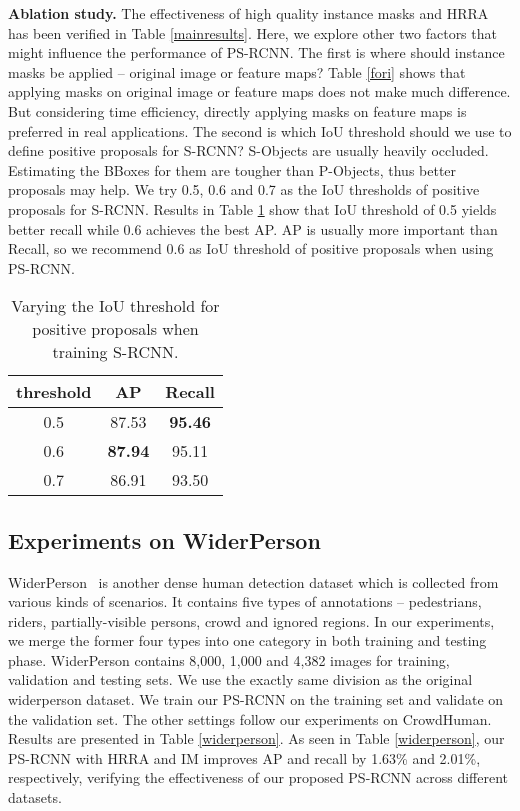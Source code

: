 \documentclass{article}
\begin{document}
\noindent \textbf{Ablation study.} The effectiveness of high quality instance masks and HRRA has been verified in Table \ref{mainresults}. Here, we explore other two factors that might influence the performance of PS-RCNN. The first is where should instance masks be applied -- original image or feature maps? Table \ref{fori} shows that applying masks on original image or feature maps does not make much difference. But considering time efficiency, directly applying masks on feature maps is preferred in real applications. The second is which IoU threshold should we use to define positive proposals for S-RCNN? S-Objects are usually heavily occluded. Estimating the BBoxes for them are tougher than P-Objects, thus better proposals may help. We try 0.5, 0.6 and 0.7 as the IoU thresholds of positive proposals for S-RCNN. Results in Table \ref{thre} show that IoU threshold of 0.5 yields better recall while 0.6 achieves the best AP. AP is usually more important than Recall, so we recommend 0.6 as IoU threshold of positive proposals when using PS-RCNN.



\begin{table}[]
\caption{Varying the IoU threshold for positive proposals when training S-RCNN.}
\centering
\begin{tabular}{c|cc}
\hline
threshold & AP    & Recall \\ \hline
0.5       & 87.53 & \textbf{95.46}  \\
0.6       & \textbf{87.94} & 95.11  \\
0.7       & 86.91 & 93.50  \\ \hline
\end{tabular}\label{thre}
\vspace{-0.5cm}
\end{table}

\vspace{-0.3cm}
\subsection{Experiments on WiderPerson}
\vspace{-0.2cm}
WiderPerson~\cite{Zhang2019WiderPerson} is another dense human detection dataset which is collected from various kinds of scenarios. It contains five types of annotations -- pedestrians, riders, partially-visible persons, crowd and ignored regions. In our experiments, we merge the former four types into one category in both training and testing phase. WiderPerson contains 8,000, 1,000 and 4,382 images for training, validation and testing sets. We use the exactly same division as the original widerperson dataset. We train our PS-RCNN on the training set and validate on the validation set. The other settings follow our experiments on CrowdHuman. Results are presented in Table \ref{widerperson}. As seen in Table \ref{widerperson}, our PS-RCNN with HRRA and IM improves AP and recall by 1.63\% and 2.01\%, respectively, verifying the effectiveness of our proposed PS-RCNN across different datasets.
\end{document}
